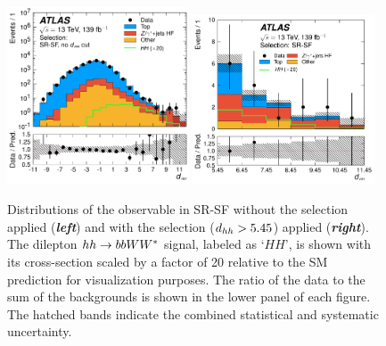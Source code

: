 \begin{figure}[!htb]
    \begin{center}
        \includegraphics[width=0.48\textwidth]{figures/search_hh/results/sr_plots/srSFNoDhh_NN_d_hh}
        \includegraphics[width=0.48\textwidth]{figures/search_hh/results/sr_plots/srSFNoDhhCloseCut_NN_d_hh}
        \caption{
            Distributions of the \dhh observable in SR-SF without the \dhh selection applied (\textit{\textbf{left}})
            and with the \dhh selection ($ d_{hh} > 5.45$) applied (\textit{\textbf{right}}).
            The dilepton $hh \rightarrow bbWW^*$ signal, labeled as `$HH$', is shown with its cross-section scaled
            by a factor of 20 relative to the SM prediction for visualization purposes.
            The ratio of the data to the sum of the backgrounds is shown in the lower panel of each figure.
            The hatched bands indicate the combined statistical and systematic uncertainty.
        }
        \label{fig:hh_sr_kin_2}
    \end{center}
\end{figure}


